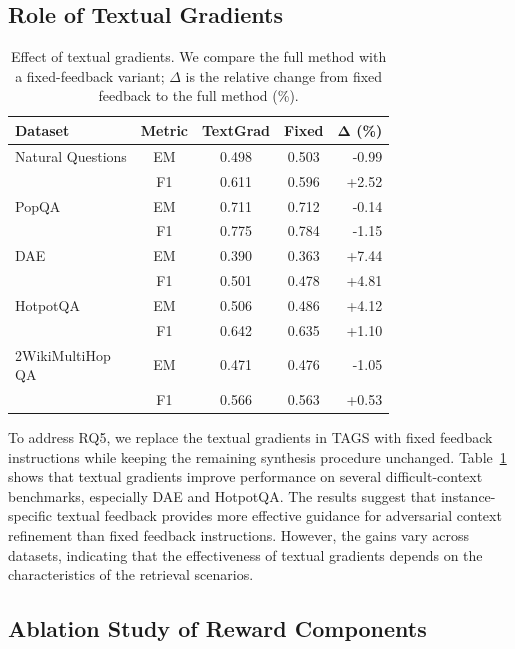 \documentclass[11pt]{article}
\begin{document}
\subsection{Role of Textual Gradients}
\label{subsec:textual_gradients}
\begin{table}[t]
  \caption{Effect of textual gradients. We compare the full method with a fixed-feedback variant; $\Delta$ is the relative change from fixed feedback to the full method (\%).}
  \label{tab:textgrad_delta}
  \centering
  \small
  \setlength{\tabcolsep}{4pt}
  \renewcommand{\arraystretch}{1.1}
  \begin{tabular}{@{}p{2.3cm} c c c r@{}}
  \toprule
  \textbf{Dataset} & \textbf{Metric} & \textbf{TextGrad} & \textbf{Fixed} & $\mathbf{\Delta}$ \textbf{(\%)} \\
  \midrule
  Natural Questions
   & EM & 0.498 & 0.503 & -0.99 \\
   & F1 & 0.611 & 0.596 & +2.52 \\
  \midrule
  PopQA
   & EM & 0.711 & 0.712 & -0.14 \\
   & F1 & 0.775 & 0.784 & -1.15 \\
  \midrule
  DAE
   & EM & 0.390 & 0.363 & +7.44 \\
   & F1 & 0.501 & 0.478 & +4.81 \\
  \midrule
  HotpotQA
   & EM & 0.506 & 0.486 & +4.12 \\
   & F1 & 0.642 & 0.635 & +1.10 \\
  \midrule
  \shortstack[l]{2WikiMultiHop\\QA}
   & EM & 0.471 & 0.476 & -1.05 \\
   & F1 & 0.566 & 0.563 & +0.53 \\
  \bottomrule
  \end{tabular}
\end{table}


To address RQ5, we replace the textual gradients in TAGS with fixed feedback instructions while keeping the remaining synthesis procedure unchanged. Table~\ref{tab:textgrad_delta} shows that textual gradients improve performance on several difficult-context benchmarks, especially DAE and HotpotQA. The results suggest that instance-specific textual feedback provides more effective guidance for adversarial context refinement than fixed feedback instructions. However, the gains vary across datasets, indicating that the effectiveness of textual gradients depends on the characteristics of the retrieval scenarios.

\subsection{Ablation Study of Reward Components}
\end{document}
